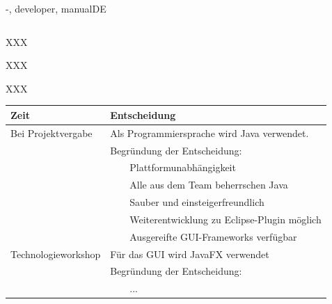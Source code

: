 \documentclass[twoside]{report}
\newcommand{\tabitem}{~~\llap{\textbullet}~~}
\begin{document}
\begin{shownto}{-, developer, manualDE}
\begin{table}[h]
\begin{tabular}{|l|l|l|l|p{8cm}|}
\bottomrule
\end{tabular}
\end{table}
\nsecend


\nsecend

\nsecend %







\nsecend

XXX
\nsecend

XXX
\nsecend

XXX
\nsecend


\begin{table}[h]
\centering
\begin{tabular}{|l|l|}
\toprule
Zeit & Entscheidung \\
\midrule
Bei Projektvergabe & Als Programmiersprache wird Java verwendet.\\
& Begründung der Entscheidung:\\
&      \tabitem Plattformunabhängigkeit\\
&      \tabitem Alle aus dem Team beherrschen Java\\
&      \tabitem Sauber und einsteigerfreundlich\\
&      \tabitem Weiterentwicklung zu Eclipse-Plugin möglich\\
&      \tabitem Ausgereifte GUI-Frameworks verfügbar\\
\midrule
Technologieworkshop & Für das GUI wird JavaFX verwendet\\
& Begründung der Entscheidung:\\
&      \tabitem ...\\
\bottomrule
\end{tabular}
\end{table}
\nsecend


\nsecend %

\end{shownto} %
\end{document}
